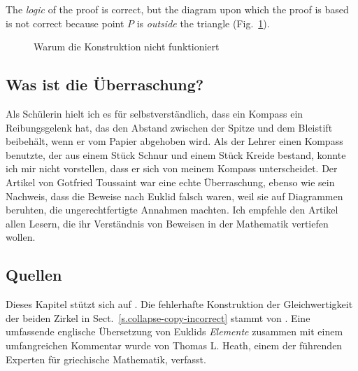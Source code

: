 The \emph{logic} of the proof is correct, but the diagram upon which the proof is based is not correct because point $P$ is \emph{outside} the triangle (Fig.~\ref{f.collapse-isoceles-2}).

\begin{figure}[b]
\begin{center}
\caption{Warum die Konstruktion nicht funktioniert}\label{f.collapse-isoceles-2}
\end{center}
\end{figure}

\subsection*{Was ist die Überraschung?}

Als Schülerin hielt ich es für selbstverständlich, dass ein Kompass ein Reibungsgelenk hat, das den Abstand zwischen der Spitze und dem Bleistift beibehält, wenn er vom Papier abgehoben wird. Als der Lehrer einen Kompass benutzte, der aus einem Stück Schnur und einem Stück Kreide bestand, konnte ich mir nicht vorstellen, dass er sich von meinem Kompass unterscheidet. Der Artikel von Gotfried Toussaint war eine echte Überraschung, ebenso wie sein Nachweis, dass die Beweise nach Euklid falsch waren, weil sie auf Diagrammen beruhten, die ungerechtfertigte Annahmen machten. Ich empfehle den Artikel allen Lesern, die ihr Verständnis von Beweisen in der Mathematik vertiefen wollen.

\subsection*{Quellen}

Dieses Kapitel stützt sich auf \cite{toussaint}. Die fehlerhafte Konstruktion der Gleichwertigkeit der beiden Zirkel in Sect.~\ref{s.collapse-copy-incorrect} stammt von \cite{rusty}. Eine umfassende englische Übersetzung von Euklids \textit{Elemente} zusammen mit einem umfangreichen Kommentar \cite{euclid} wurde von Thomas L. Heath, einem der führenden Experten für griechische Mathematik, verfasst.
